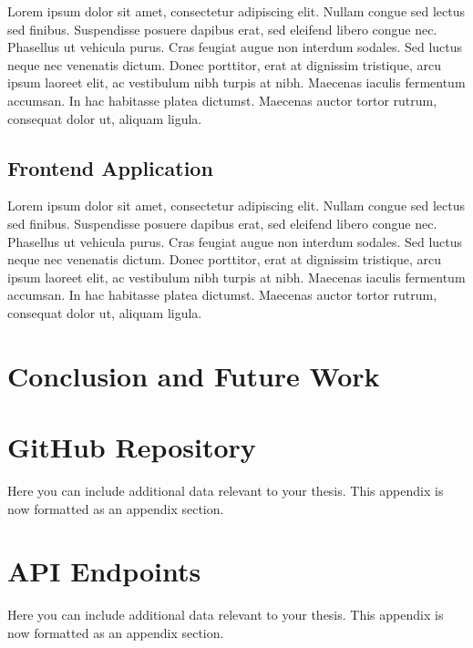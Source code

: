 \documentclass{utitcphd_overleaf}
\begin{document}
Lorem ipsum dolor sit amet, consectetur adipiscing elit. Nullam congue sed lectus sed finibus. Suspendisse posuere dapibus erat, sed eleifend libero congue nec. Phasellus ut vehicula purus. Cras feugiat augue non interdum sodales. Sed luctus neque nec venenatis dictum. Donec porttitor, erat at dignissim tristique, arcu ipsum laoreet elit, ac vestibulum nibh turpis at nibh. Maecenas iaculis fermentum accumsan. In hac habitasse platea dictumst. Maecenas auctor tortor rutrum, consequat dolor ut, aliquam ligula.

\section{Frontend Application}

Lorem ipsum dolor sit amet, consectetur adipiscing elit. Nullam congue sed lectus sed finibus. Suspendisse posuere dapibus erat, sed eleifend libero congue nec. Phasellus ut vehicula purus. Cras feugiat augue non interdum sodales. Sed luctus neque nec venenatis dictum. Donec porttitor, erat at dignissim tristique, arcu ipsum laoreet elit, ac vestibulum nibh turpis at nibh. Maecenas iaculis fermentum accumsan. In hac habitasse platea dictumst. Maecenas auctor tortor rutrum, consequat dolor ut, aliquam ligula.



\chapter{Conclusion and Future Work}
\label{chap:conclusion}

\appendix
\chapter{GitHub Repository}
\label{app:additionaldata}

Here you can include additional data relevant to your thesis. This appendix is now formatted as an appendix section.

\chapter{API Endpoints}
\label{app:additionaldata}

Here you can include additional data relevant to your thesis. This appendix is now formatted as an appendix section.
\end{document}
